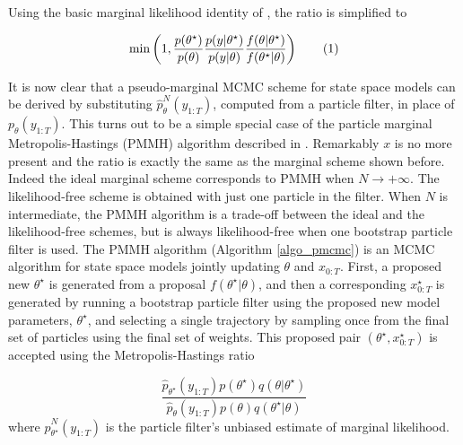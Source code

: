 \documentclass[11pt,a4,twosided,singlespacing,titlepagenumber=on]{scrreprt}
\numberwithin{equation}{chapter} %
\theoremstyle{remark}
\newcommand\numberthis{\addtocounter{equation}{1}\tag{\theequation}}
\begin{document}
Using the basic marginal likelihood identity of \cite{chib1995}, the ratio is simplified to

\begin{align*}
 \min \left(1, \frac{p(\theta^\star)}{p(\theta)}  \frac{p(y|\theta^\star)}{p(y|\theta)} \frac{f(\theta|\theta^\star)}{f(\theta^\star|\theta)} \right) \numberthis
\end{align*}


It is now clear that a pseudo-marginal MCMC scheme for state space models can be derived by substituting $\hat{p}^N_{\theta}(y_{1:T})$, computed from a particle filter, in place of $p_{\theta}(y_{1:T})$. This turns out to be a simple special case of the particle marginal Metropolis-Hastings (PMMH) algorithm described in \cite{andrieu2010}. Remarkably $x$ is no more present and the ratio is exactly the same as the marginal scheme shown before. Indeed the ideal marginal scheme corresponds to PMMH when $N \rightarrow +\infty$. The likelihood-free scheme is obtained with just one particle in the filter. When $N$ is intermediate, the PMMH algorithm is a trade-off between the ideal and the likelihood-free schemes, but is always likelihood-free when one bootstrap particle filter is used. The PMMH algorithm (Algorithm \ref{algo_pmcmc}) is an MCMC algorithm for state space models jointly updating $\theta$ and $x_{0:T}$. First, a proposed new $\theta^\star$ is generated from a proposal $f(\theta^\star|\theta)$, and then a corresponding $x_{0:T}^\star$ is generated by running a bootstrap particle filter using the proposed new model parameters, $\theta^\star$, and selecting a single trajectory by sampling once from the final set of particles using the final set of weights. This proposed pair $(\theta^\star,x_{0:T}^\star)$ is accepted using the Metropolis-Hastings ratio

\begin{equation}
\displaystyle \frac{\hat{p}_{\theta^\star}(y_{1:T})p(\theta^\star)q(\theta|\theta^\star)}{\hat{p}_{\theta}(y_{1:T})p(\theta)q(\theta^\star|\theta)}
\end{equation} 
where $\hat{p}^N_{\theta^\star}(y_{1:T})$ is the particle filter's unbiased estimate of marginal likelihood. 
\end{document}
